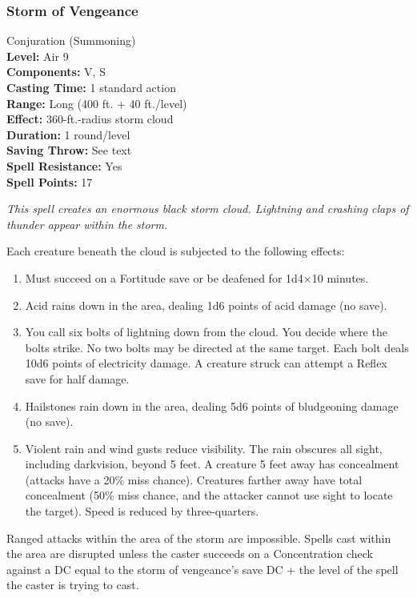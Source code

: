 \subsubsection{Storm of Vengeance}
\label{Spell:StormOfVengeance}
Conjuration (Summoning)
\\ \textbf{Level:} Air 9
\\ \textbf{Components:} V, S
\\ \textbf{Casting Time:} 1 standard action
\\ \textbf{Range:} Long (400 ft. + 40 ft./level)
\\ \textbf{Effect:} 360-ft.-radius storm cloud
\\ \textbf{Duration:} 1 round/level
\\ \textbf{Saving Throw:} See text
\\ \textbf{Spell Resistance:} Yes
\\ \textbf{Spell Points:} 17

\emph{This spell creates an enormous black storm cloud. Lightning and crashing claps of thunder appear within the storm. }

Each creature beneath the cloud is subjected to the following effects:

\begin{enumerate}
 \item Must succeed on a Fortitude save or be deafened for 1d4$\times$10 minutes.
 \item Acid rains down in the area, dealing 1d6 points of acid damage (no save).
 \item You call six bolts of lightning down from the cloud. You decide where the bolts strike. No two bolts may be directed at the same target. Each bolt deals 10d6 points of electricity damage. A creature struck can attempt a Reflex save for half damage.
 \item Hailstones rain down in the area, dealing 5d6 points of bludgeoning damage (no save).
 \item Violent rain and wind gusts reduce visibility. The rain obscures all sight, including darkvision, beyond 5 feet. A creature 5 feet away has concealment (attacks have a 20\% miss chance). Creatures farther away have total concealment (50\% miss chance, and the attacker cannot use sight to locate the target). Speed is reduced by three-quarters.
\end{enumerate}
Ranged attacks within the area of the storm are impossible. 
Spells cast within the area are disrupted unless the caster succeeds on a Concentration check against a DC equal to the storm of vengeance's save DC + the level of the spell the caster is trying to cast.
